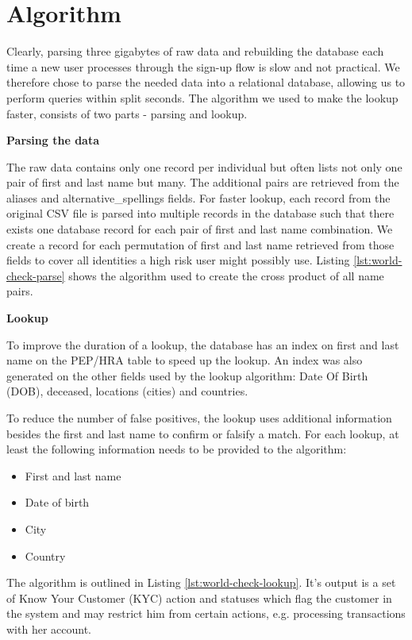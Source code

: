 \documentclass[a4paper, oneside]{csthesis}
\begin{document}
\section{Algorithm}

Clearly, parsing three gigabytes of raw data and rebuilding the database each time a new user processes through the sign-up flow is slow and not practical. We therefore chose to parse the needed data into a relational database, allowing us to perform queries within split seconds. The algorithm we used to make the lookup faster, consists of two parts - parsing and lookup.

\textbf{Parsing the data}

The raw data contains only one record per individual but often lists not only one pair of first and last name but many. The additional pairs are retrieved from the aliases and alternative\_spellings fields. For faster lookup, each record from the original CSV file is parsed into multiple records in the database such that there exists one database record for each pair of first and last name combination. We create a record for each permutation of first and last name retrieved from those fields to cover all identities a high risk user might possibly use.
Listing \ref{lst:world-check-parse} shows the algorithm used to create the cross product of all name pairs.

\textbf{Lookup}

To improve the duration of a lookup, the database has an index on first and last name on the PEP/HRA table to speed up the lookup. An index was also generated on the other fields used by the lookup algorithm: Date Of Birth (DOB), deceased, locations (cities) and countries.

To reduce the number of false positives, the lookup uses additional information besides the first and last name to confirm or falsify a match. For each lookup, at least the following information needs to be provided to the algorithm:
\begin{itemize}
\item First and last name
\item Date of birth
\item City
\item Country
\end{itemize}

The algorithm is outlined in Listing \ref{lst:world-check-lookup}. It's output is a set of Know Your Customer (KYC) action and statuses which flag the customer in the system and may restrict him from certain actions, e.g. processing transactions with her account.
\end{document}
